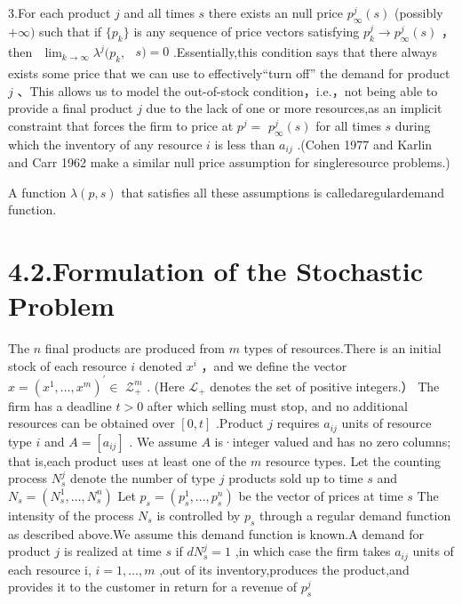 3.For each product \(j\) and all times \(s\) there exists an null price
\(p _ { \infty } ^ { j } ( s )\) (possibly \(+ \infty )\) such that if
\(\{ p _ { k } \}\) is any sequence of price vectors satisfying
\(p _ { k } ^ { j } \to p _ { \infty } ^ { j } ( s )\) ，then
\(\begin{array} { r } { \operatorname* { l i m } _ { k \to \infty } \lambda ^ { j } ( p _ { k } , } \end{array}\)
\(s ) = 0\) .Essentially,this condition says that there always exists
some price that we can use to effectively``turn off'' the demand for
product \(j\) 、This allows us to model the out-of-stock
condition，i.e.，not being able to provide a final product \(j\) due to
the lack of one or more resources,as an implicit constraint that forces
the firm to price at \(p ^ { j } =\) \(p _ { \infty } ^ { j } ( s )\)
for all times \(s\) during which the inventory of any resource \(i\) is
less than \(a _ { i j }\) .(Cohen 1977 and Karlin and Carr 1962 make a
similar null price assumption for singleresource problems.)

A function \(\lambda ( p , s )\) that satisfies all these assumptions is
calledaregulardemand function.

\section{4.2.Formulation of the Stochastic
Problem}\label{formulation-of-the-stochastic-problem}

The \(n\) final products are produced from \(m\) types of
resources.There is an initial stock of each resource \(i\) denoted
\(x ^ { i }\) ，and we define the vector
\(x = ( x ^ { 1 } , \ldots , x ^ { m } ) ^ { \prime } \in\)
\(\mathscr { Z } _ { + } ^ { m }\) . (Here \(\mathscr { L } _ { + }\)
denotes the set of positive integers.） The firm has a deadline
\(t > 0\) after which selling must stop, and no additional resources can
be obtained over \([ 0 , t ]\) .Product \(j\) requires \(a _ { i j }\)
units of resource type \(i\) and \(A = [ a _ { i j } ]\) . We assume
\(A\) is·integer valued and has no zero columns; that is,each product
uses at least one of the \(m\) resource types. Let the counting process
\(N _ { s } ^ { j }\) denote the number of type \(j\) products sold up
to time \(s\) and
\(N _ { s } = ( N _ { s } ^ { 1 } , \ldots , N _ { s } ^ { n } )\) Let
\(p _ { s } = ( p _ { s } ^ { 1 } , . . . , p _ { s } ^ { n } )\) be the
vector of prices at time \(s\) The intensity of the process
\(N _ { s }\) is controlled by \(p _ { s }\) through a regular demand
function as described above.We assume this demand function is known.A
demand for product \(j\) is realized at time \(s\) if
\(d N _ { s } ^ { j } = 1\) ,in which case the firm takes
\(a _ { i j }\) units of each resource i, \(i = 1 , \ldots , m\) ,out of
its inventory,produces the product,and provides it to the customer in
return for a revenue of \(p _ { s } ^ { j }\)

